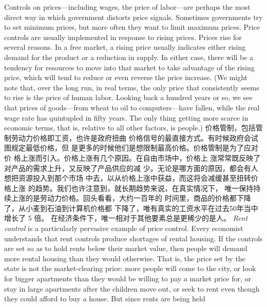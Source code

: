 \begin{paracol}{2}
Controls on prices---including wages, the price of labor---are
perhaps the most direct way in which government distorts price
signals. Sometimes governments try to set minimum prices,
but more often they want to limit maximum prices. Price controls are usually implemented in response to rising prices. Prices
rise for several reasons. In a free market, a rising price usually
indicates either rising demand for the product or a reduction in
supply. In either case, there will be a tendency for resources to
move into that market to take advantage of the rising price,
which will tend to reduce or even reverse the price increase. (We
might note that, over the long run, in real terms, the only price
that consistently seems to rise is the price of human labor.
Looking back a hundred years or so, we see that prices of
goods---from wheat to oil to computers---have fallen, while the
real wage rate has quintupled in fifty years. The only thing getting more scarce in economic terms, that is, relative to all other
factors, is people.)
\switchcolumn
价格管制，包括管制劳动力价格即工资，也许是政府扭曲
价格信号的最直接方式。有时候政府会试图规定最低价格，但
是更多的时候他们是想限制最高价格。价格管制是为了应对价
格上涨而引入。价格上涨有几个原因。在自由市场中，价格上
涨常常既反映了对产品的需求上升，又反映了产品供应的减
少。无论是哪方面的原因，都会有人想把资源投入到那个市场
中去，以从价格上涨中获益，而这将会减缓甚至扭转价格上涨
的趋势。我们也许注意到，就长期趋势来说，在真实情况下，
唯一保持持续上涨的是劳动力价格。回头看看，大约一百年的
时间里，商品的价格都下降了，从小麦到石油到计算机价格都
下降了，唯有真实的工资水平在过去50年当中增长了 5 倍。
在经济条件下，唯一相对于其他要素总是更稀少的是人。
\switchcolumn*
\textit{Rent control} is a particularly pervasive example of price control. Every economist understands that rent controls produce
shortages of rental housing. If the controls are set so as to hold
rents below their market value, then people will demand more rental housing than they would otherwise. That is, the price set
by the state is not the market-clearing price: more people will
come to the city, or look for bigger apartments than they would
be willing to pay a market price for, or stay in large apartments
after the children move out, or seek to rent even though they
could afford to buy a house. But since rents are being held

\end{paracol}
